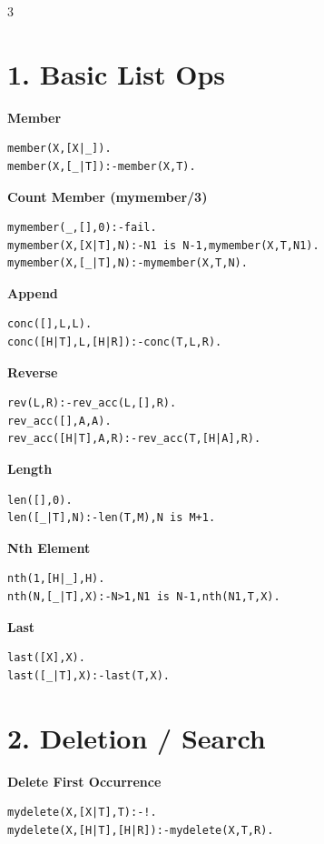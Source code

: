 \documentclass[8pt,landscape]{article}
\begin{document}
\begin{multicols*}{3}

\section*{1. Basic List Ops}

\textbf{Member}
\begin{lstlisting}
member(X,[X|_]).
member(X,[_|T]):-member(X,T).
\end{lstlisting}

\textbf{Count Member (mymember/3)}
\begin{lstlisting}
mymember(_,[],0):-fail.
mymember(X,[X|T],N):-N1 is N-1,mymember(X,T,N1).
mymember(X,[_|T],N):-mymember(X,T,N).
\end{lstlisting}

\textbf{Append}
\begin{lstlisting}
conc([],L,L).
conc([H|T],L,[H|R]):-conc(T,L,R).
\end{lstlisting}

\textbf{Reverse}
\begin{lstlisting}
rev(L,R):-rev_acc(L,[],R).
rev_acc([],A,A).
rev_acc([H|T],A,R):-rev_acc(T,[H|A],R).
\end{lstlisting}

\textbf{Length}
\begin{lstlisting}
len([],0).
len([_|T],N):-len(T,M),N is M+1.
\end{lstlisting}

\textbf{Nth Element}
\begin{lstlisting}
nth(1,[H|_],H).
nth(N,[_|T],X):-N>1,N1 is N-1,nth(N1,T,X).
\end{lstlisting}

\textbf{Last}
\begin{lstlisting}
last([X],X).
last([_|T],X):-last(T,X).
\end{lstlisting}

\section*{2. Deletion / Search}

\textbf{Delete First Occurrence}
\begin{lstlisting}
mydelete(X,[X|T],T):-!.
mydelete(X,[H|T],[H|R]):-mydelete(X,T,R).
\end{lstlisting}


\end{multicols*}
\end{document}
